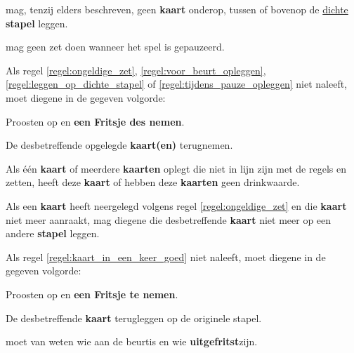 \vervolgLijst{}
\item \EenSpeler mag, tenzij elders beschreven, geen \textbf{kaart} onderop, tussen of bovenop de \ul{dichte} \textbf{stapel} leggen.
\label{regel:leggen_op_dichte_stapel}
\eindLijst{}

\vervolgLijst{}
\item \EenSpeler mag geen zet doen wanneer het spel is gepauzeerd\footnotemark[2].
\label{regel:tijdens_pauze_opleggen}
\eindLijst{}

\vervolgLijst{}
\item Als \eenSpeler regel \ref{regel:ongeldige_zet}, \ref{regel:voor_beurt_opleggen}, \ref{regel:leggen_op_dichte_stapel} of \ref{regel:tijdens_pauze_opleggen} niet naleeft, moet diegene in de gegeven volgorde:
\puntLijst{}
\item Proosten op  en \textbf{een Fritsje des nemen}\footnotemark[3].
\item De desbetreffende opgelegde \textbf{kaart(en)} terugnemen.
\eindPuntLijst{}
\label{regel:kaarten_terugnemen_2}
\eindLijst{}

\vervolgLijst{}
\item Als \eenSpeler één \textbf{kaart} of meerdere \textbf{kaarten} oplegt die niet in lijn zijn met de regels en zetten, heeft deze \textbf{kaart} of hebben deze \textbf{kaarten} geen drinkwaarde.
\eindLijst{}


\vervolgLijst{}
\item Als \eenSpeler een \textbf{kaart} heeft neergelegd volgens regel \ref{regel:ongeldige_zet} en die \textbf{kaart} niet meer aanraakt, mag diegene die desbetreffende \textbf{kaart} niet meer op een andere \textbf{stapel} leggen.
\label{regel:kaart_in_een_keer_goed}
\eindLijst{}

\vervolgLijst{}
\item Als \eenSpeler regel \ref{regel:kaart_in_een_keer_goed} niet naleeft, moet diegene in de gegeven volgorde:
\puntLijst{}
\item Proosten op  en \textbf{een Fritsje te nemen}\footnotemark[3].
\item De desbetreffende \textbf{kaart} terugleggen op de originele stapel.
\eindPuntLijst{}
\eindLijst{}


\vervolgLijst{}
\item \EenSpeler moet van \alleSpelers weten wie aan de beurt\footnotemark[1] is en wie \textbf{uitgefritst}\footnotemark[4] zijn.
\eindLijst{}

